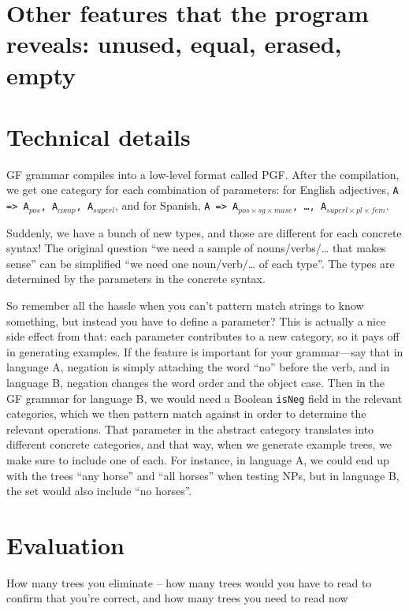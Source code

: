 \documentclass[11pt]{article}
\begin{document}
\section{Other features that the program reveals: unused, equal,
  erased, empty}



\section{Technical details}
\label{sec:details}

GF grammar compiles into a low-level format called PGF. After the
compilation, we get one category for each combination of parameters:
for English adjectives, \texttt{A => A$_{pos}$, A$_{comp}$,
A$_{superl}$}, and for Spanish, \texttt{A => A$_{pos×sg×masc}$, \dots,
A$_{superl×pl×fem}$}. 

Suddenly, we have a bunch of new types, and those are different for
each concrete syntax! The original question ``we need a sample of
nouns/verbs/… that makes sense'' can be simplified ``we need one
noun/verb/… of each type''. The types are determined by the parameters
in the concrete syntax. 

So remember all the hassle when you can't pattern match strings to
know something, but instead you have to define a parameter? This is
actually a nice side effect from that: each parameter contributes to a
new category, so it pays off in generating examples. If the feature is
important for your grammar---say that in language A, negation is
simply attaching the word  ``no'' before the verb, and in language B,
negation changes the word order and the object case. Then in the GF
grammar for language B, we would need a Boolean \texttt{isNeg} field
in the relevant categories, which we then pattern match against in
order to determine the relevant operations. That parameter in the
abstract category translates into different concrete categories, and
that way, when we generate example trees, we make sure to include one
of each. For instance, in language A, we could end up with the trees
``any horse'' and ``all horses'' when testing NPs, but in language B,
the set would also include ``no horses''. 


\section{Evaluation}

How many trees you eliminate -- how many trees would you have to read
to confirm that you're correct, and how many trees you need to read
now
\end{document}
